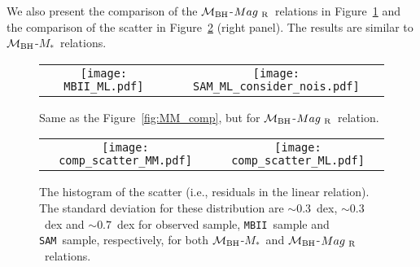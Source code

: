\documentclass[twocolumn,trackchanges]{aastex63}
\newcommand{\mbh}{$\mathcal M_{\rm BH}$}
\newcommand{\mr}{$Mag_{\rm ~R}$}
\newcommand{\mstar}{{$M_*$}}
\newcommand{\sam}{\texttt{SAM}}
\newcommand{\mbii}{\texttt{MBII}}
\begin{document}

We also present the comparison of the \mbh-\mr\ relations in Figure~\ref{fig:ML_comp} and the comparison of the scatter in Figure~\ref{fig:offset_comp} (right panel). The results are similar to \mbh-\mstar\ relations.

\begin{figure*}[t]%
\begin{tabular}{c c}
\texttt{[image: MBII\_ML.pdf]} &
\texttt{[image: SAM\_ML\_consider\_nois.pdf]} \\
\end{tabular}
\caption{Same as the Figure~\ref{fig:MM_comp}, but for \mbh-\mr\ relation.}
\label{fig:ML_comp}
\end{figure*}


\begin{figure*}[t]%
\begin{tabular}{c c}
\texttt{[image: comp\_scatter\_MM.pdf]} &
\texttt{[image: comp\_scatter\_ML.pdf]} \\
\end{tabular}
\caption{The histogram of the scatter (i.e., residuals in the linear relation). The standard deviation for these distribution are $\sim0.3$~dex, $\sim0.3$~dex and $\sim0.7$~dex for observed sample, \mbii\ sample and \sam\ sample, respectively, for both \mbh-\mstar\ and \mbh-\mr\ relations.
}
\label{fig:offset_comp}
\end{figure*}
\end{document}
